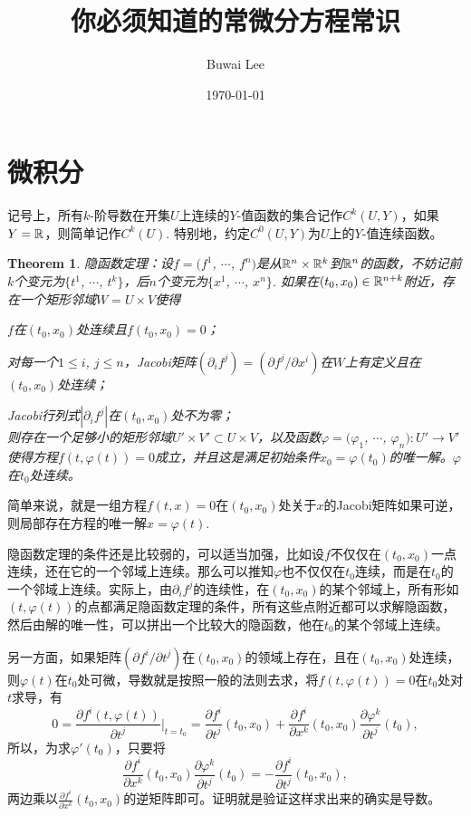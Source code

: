 \documentclass[10pt]{article}
\theoremstyle{plain}%
\newtheorem{theo}{Theorem}[section]%
\begin{document}
\title{你必须知道的常微分方程常识}
\author{Buwai Lee}
\date{\today}
\maketitle %

\section{微积分}

记号上，所有$k$-阶导数在开集$U$上连续的$Y$-值函数的集合记作$C^k(U,Y)$，如果$Y=\mathbb{R}$，则简单记作$C^k(U)$. 特别地，约定$C^0(U,Y)$为$U$上的$Y$-值连续函数。

\begin{theo}
	隐函数定理：设$f=(f^1$, $\cdots$, $f^n)$是从$\mathbb{R}^{n}\times \mathbb{R}^k$到$\mathbb{R}^n$的函数，不妨记前$k$个变元为$\{t^1$, $\cdots$, $t^k\}$，后$n$个变元为$\{x^1$, $\cdots$, $x^n\}$. 如果在$(t_0,x_0)\in \mathbb{R}^{n+k}$附近，存在一个矩形邻域$W=U\times V$使得

	 $f$在$(t_0,x_0)$处连续且$f(t_0,x_0)=0$；

	 对每一个$1\leq i$, $j\leq n$，Jacobi矩阵$(\partial_i f^j)=(\partial f^j/\partial x^i)$在$W$上有定义且在$(t_0,x_0)$处连续；

	 Jacobi行列式$|\partial_i f^j|$在$(t_0,x_0)$处不为零；\\
\noindent 则存在一个足够小的矩形邻域$U'\times V'\subset U\times V$，以及函数$\varphi=(\varphi_1$, $\cdots$, $\varphi_n):U' \to V'$使得方程$f(t,\varphi(t))=0$成立，并且这是满足初始条件$x_0=\varphi(t_0)$的唯一解。$\varphi$在$t_0$处连续。
\end{theo}

简单来说，就是一组方程$f(t,x)=0$在$(t_0,x_0)$处关于$x$的Jacobi矩阵如果可逆，则局部存在方程的唯一解$x=\varphi(t)$.

隐函数定理的条件还是比较弱的，可以适当加强，比如设$f$不仅仅在$(t_0,x_0)$一点连续，还在它的一个邻域上连续。那么可以推知$\varphi$也不仅仅在$t_0$连续，而是在$t_0$的一个邻域上连续。实际上，由$\partial_i f^j$的连续性，在$(t_0,x_0)$的某个邻域上，所有形如$(t,\varphi(t))$的点都满足隐函数定理的条件，所有这些点附近都可以求解隐函数，然后由解的唯一性，可以拼出一个比较大的隐函数，他在$t_0$的某个邻域上连续。

另一方面，如果矩阵$(\partial f^i/\partial t^j)$在$(t_0,x_0)$的领域上存在，且在$(t_0,x_0)$处连续，则$\varphi(t)$在$t_0$处可微，导数就是按照一般的法则去求，将$f(t,\varphi(t))=0$在$t_0$处对$t$求导，有
\[
	0=\frac{\partial f^i(t,\varphi(t))}{\partial t^j}\bigg|_{t=t_0}=\frac{\partial f^i}{\partial t^j}(t_0,x_0)+\frac{\partial f^i}{\partial x^k}(t_0,x_0)\frac{\partial \varphi^k}{\partial t^j}(t_0),
\]
所以，为求$\varphi'(t_0)$，只要将
\[
	\frac{\partial f^i}{\partial x^k}(t_0,x_0)\frac{\partial \varphi^k}{\partial t^j}(t_0)=-\frac{\partial f^i}{\partial t^j}(t_0,x_0),
\]
两边乘以$\frac{\partial f^i}{\partial x^k}(t_0,x_0)$的逆矩阵即可。证明就是验证这样求出来的确实是导数。
\end{document}
